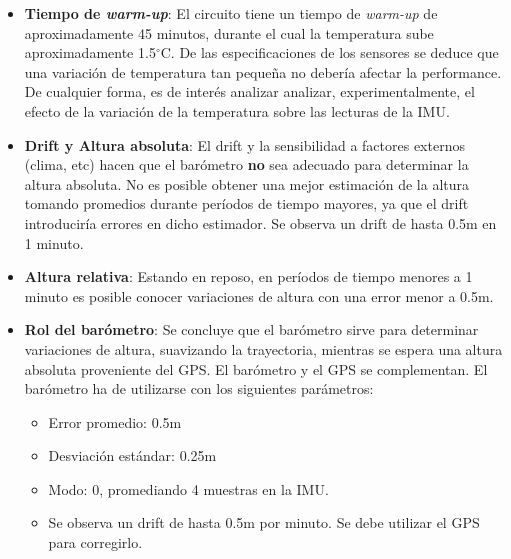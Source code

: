\documentclass[main]{subfiles}
\newcommand{\degc}{$^\circ$C}
\begin{document}
\begin{itemize}
\item \textbf{Tiempo de \textit{warm-up}}: El circuito tiene un tiempo de \textit{warm-up} de aproximadamente 45 minutos, durante el cual la temperatura sube aproximadamente 1.5\degc. De las especificaciones de los sensores se deduce que una variación de temperatura tan pequeña no debería afectar la performance. De cualquier forma, es de interés analizar analizar, experimentalmente, el efecto de la variación de la temperatura sobre las lecturas de la IMU.
\item \textbf{Drift y Altura absoluta}: El drift y la sensibilidad a factores externos (clima, etc) hacen que el barómetro \textbf{no} sea adecuado para determinar la altura absoluta. No es posible obtener una mejor estimación de la altura tomando promedios durante períodos de tiempo mayores, ya que el drift introduciría errores en dicho estimador. Se observa un drift de hasta 0.5m en 1 minuto.
\item \textbf{Altura relativa}: Estando en reposo, en períodos de tiempo menores a 1 minuto es posible conocer variaciones de altura con una error menor a 0.5m.
\item \textbf{Rol del barómetro}: Se concluye que el barómetro sirve para determinar variaciones de altura, suavizando la trayectoria, mientras se espera una altura absoluta proveniente del GPS. El barómetro y el GPS se complementan. El barómetro ha de utilizarse con los siguientes parámetros:
  \begin{itemize}
  \item Error promedio: 0.5m
  \item Desviación estándar: 0.25m
  \item Modo: 0, promediando 4 muestras en la IMU.
  \item Se observa un drift de hasta 0.5m por minuto. Se debe utilizar el GPS para corregirlo.
  \end{itemize}
\end{itemize}
\end{document}
